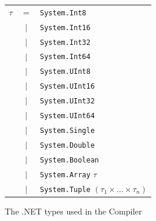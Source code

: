 \begin{figure}[H]
  \centering
\begin{tabular}{l c l}%
   $\tau$& $=$     &  \texttt{System.Int8} \\
         & $\vert$ &  \texttt{System.Int16} \\
         & $\vert$ &  \texttt{System.Int32} \\
         & $\vert$ &  \texttt{System.Int64} \\
         & $\vert$ &  \texttt{System.UInt8} \\
         & $\vert$ &  \texttt{System.UInt16} \\
         & $\vert$ &  \texttt{System.UInt32} \\
         & $\vert$ &  \texttt{System.UInt64} \\
         & $\vert$ &  \texttt{System.Single} \\
         & $\vert$ &  \texttt{System.Double} \\
         & $\vert$ &  \texttt{System.Boolean} \\
         & $\vert$ &  \texttt{System.Array} $\tau$ \\
         & $\vert$ &  \texttt{System.Tuple} $(\tau_1 \times \ldots \times \tau_n)$ \\
\end{tabular}
\caption{The .NET types used in the \fshark{}Compiler}
\label{fig:fsharptypes0}
\end{figure}


